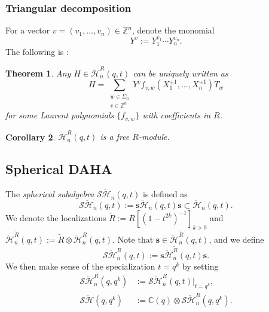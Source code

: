 \documentclass[JEP,XML,SOM,Unicode,published]{cedram}
\newtheorem{thm}{Theorem}[section]
\newtheorem{cor}[thm]{Corollary}
\theoremstyle{definition}
\newcommand{\ZZ}{\mathbb{Z}}
\newcommand{\CC}{\mathbb{C}}
\newcommand{\SHH}{\mathcal{S}\ddot{\mathcal{H}}}
\newcommand{\HH}{\ddot{\mathcal{H}}}
\newcommand{\ee}{\boldsymbol{s}}
\begin{document}
\subsubsection{Triangular decomposition}
For a vector $v=(v_1,\ldots, v_n)\in\ZZ^n$, denote the monomial
\[
Y^{v}:=Y_1^{v_1}\cdots Y_n^{v_n}.
\]
The following is \cite[Th.\,2.3(ii)]{ChereAnnals}:
\begin{thm}
Any $H\in\HH_n^R(q,t)$ can be uniquely written as
\begin{equation}
H=\sum_{\substack{w\in\Sigma_n\\ v\in\ZZ^n}}Y^vf_{v,w}(X^{\pm 1}_1,\ldots,X^{\pm 1}_n)T_w
\label{DAHAPBW}
\end{equation}
for some Laurent polynomials $\{f_{v,w}\}$ with coefficients in $R$.
\end{thm}

\begin{cor}\label{DAHAFree}
$\HH_n^R(q,t)$ is a free $R$-module.
\end{cor}

\subsection{Spherical DAHA}
The \textit{spherical subalgebra} $\SHH_n(q,t)$ is defined as
\[
\SHH_n(q,t):=\ee\HH_n(q,t)\ee\subset\HH_n(q,t).
\]
We denote the localizations $\tilde{R}:=R[(1-t^{2k})^{-1}]_{k>0}$ and $\HH^{\tilde{R}}_n(q,t):=\tilde{R}\otimes \HH^R_n(q,t)$.
Note that $\ee\in \HH^{\tilde{R}}_n(q,t)$, and we define
\[
\SHH_n^R(q,t):=\ee\HH_n^{\tilde{R}}(q,t)\ee.
\]
We then make sense of the specialization $t=q^k$ by setting
\begin{align*}
\SHH_n^R(q,q^k)&:=\SHH_n^R(q,t)\big|_{t=q^k},\\
\SHH(q,q^k)&:=\CC(q)\otimes\SHH_n^R(q,q^k).
\end{align*}
\end{document}

